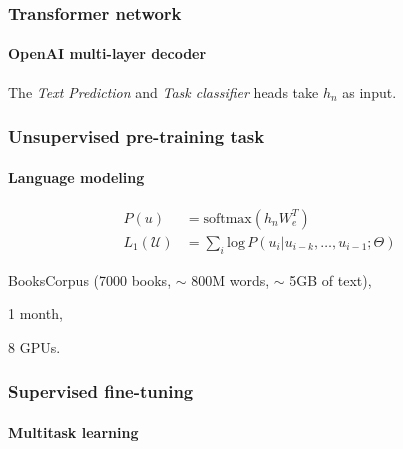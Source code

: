 \documentclass[9pt]{beamer}
\begin{document}
\begin{frame}

  \frametitle{Transformer network}

  \framesubtitle{OpenAI multi-layer decoder}

  \begin{figure}
    
  \end{figure}

  The \emph{Text Prediction} and \emph{Task classifier} heads take
  $h_{n}$ as input.
\end{frame}


\begin{frame}

  \frametitle{Unsupervised pre-training task}

  \framesubtitle{Language modeling}

  \begin{figure}
    \scalebox{0.8}{
      
    }
  \end{figure}

  \begin{align*}
    P(u) &= \text{softmax}(h_{n}W_{e}^{T})\\
    L_{1}(\mathcal{U}) &= \sum_{i} \text{log} \,P(u_{i} | u_{i - k}, \dots, u_{i - 1}; \Theta)
  \end{align*}

  \begin{description}[leftmargin=!,labelwidth=\widthof{\bfseries Hardware}]
  \item[Dataset] BooksCorpus (7000 books, $\sim$ 800M words, $\sim$ 5GB of text),
  \item[Duration] 1 month,
  \item[Hardware] 8 GPUs.
  \end{description}
\end{frame}

\begin{frame}
  \frametitle{Supervised fine-tuning}

  \framesubtitle{Multitask learning}

  \fontsize{7.5pt}{7.2}\selectfont

  \begin{figure}
    
  \end{figure}

\end{frame}
\end{document}
